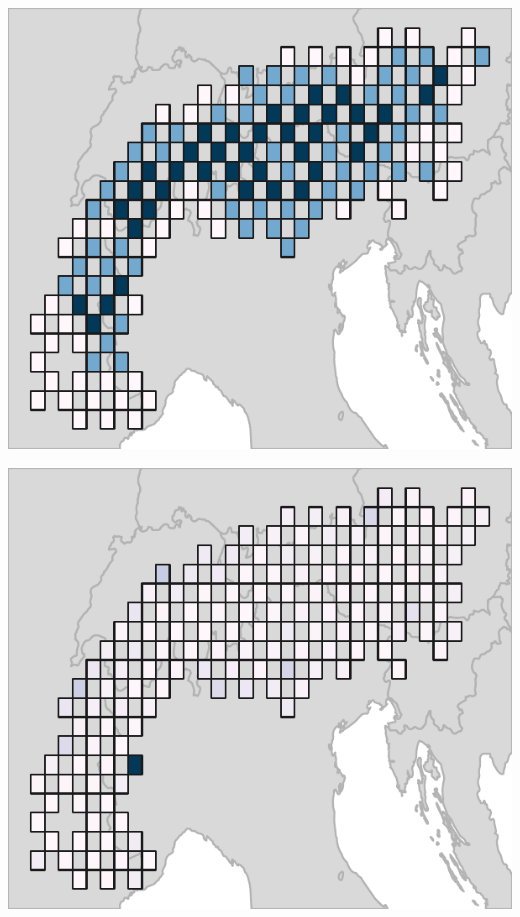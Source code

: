 \documentclass[11pt,]{article}
\let\origfigure\figure
\let\endorigfigure\endfigure
\renewenvironment{figure}[1][2] {
	\expandafter\origfigure\expandafter[H]
} {
	\endorigfigure
}
\begin{document}
\begin{figure}[htbp]
\centering
\includegraphics{supporting_information_files/figure-latex/unnamed-chunk-3-1.pdf}
\caption{Species richness. Squares denote planning units. Planning units
with a brighter color are inhabited by more species.}
\end{figure}

\begin{figure}[htbp]
\centering
\includegraphics{supporting_information_files/figure-latex/unnamed-chunk-4-1.pdf}
\caption{Climatic variation. Each panel depicts variation based on a
different principle component (PC). Squares represent planning units.
The color of each planning unit denotes the average PC value of pixels
inside it. Planning units with more similar colors have more similar
climate regimes.}
\end{figure}
\end{document}
